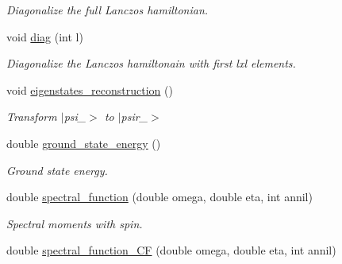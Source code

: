 \begin{DoxyCompactItemize}
\begin{DoxyCompactList}\small\item\em Diagonalize the full Lanczos hamiltonian. \end{DoxyCompactList}\item 
void \hyperlink{classlhamil_ad145f068e46c4a10f268a85fbdbb49e3}{diag} (int l)\hypertarget{classlhamil_ad145f068e46c4a10f268a85fbdbb49e3}{}\label{classlhamil_ad145f068e46c4a10f268a85fbdbb49e3}

\begin{DoxyCompactList}\small\item\em Diagonalize the Lanczos hamiltonain with first lxl elements. \end{DoxyCompactList}\item 
void \hyperlink{classlhamil_a8c7fce044a5ce803417ee685915f8bce}{eigenstates\+\_\+reconstruction} ()\hypertarget{classlhamil_a8c7fce044a5ce803417ee685915f8bce}{}\label{classlhamil_a8c7fce044a5ce803417ee685915f8bce}

\begin{DoxyCompactList}\small\item\em Transform $\vert$psi\+\_$>$ to $\vert$psir\+\_$>$ \end{DoxyCompactList}\item 
double \hyperlink{classlhamil_ada058bf85a90c1a1073aedda8303e942}{ground\+\_\+state\+\_\+energy} ()\hypertarget{classlhamil_ada058bf85a90c1a1073aedda8303e942}{}\label{classlhamil_ada058bf85a90c1a1073aedda8303e942}

\begin{DoxyCompactList}\small\item\em Ground state energy. \end{DoxyCompactList}\item 
double \hyperlink{classlhamil_ae49314d086ae17932c1807904c5507bd}{spectral\+\_\+function} (double omega, double eta, int annil)\hypertarget{classlhamil_ae49314d086ae17932c1807904c5507bd}{}\label{classlhamil_ae49314d086ae17932c1807904c5507bd}

\begin{DoxyCompactList}\small\item\em Spectral moments with spin. \end{DoxyCompactList}\item 
double \hyperlink{classlhamil_af01389bc6a2dffaf39964654f2bcdb6f}{spectral\+\_\+function\+\_\+\+CF} (double omega, double eta, int annil)\hypertarget{classlhamil_af01389bc6a2dffaf39964654f2bcdb6f}{}\label{classlhamil_af01389bc6a2dffaf39964654f2bcdb6f}


\end{DoxyCompactItemize}
